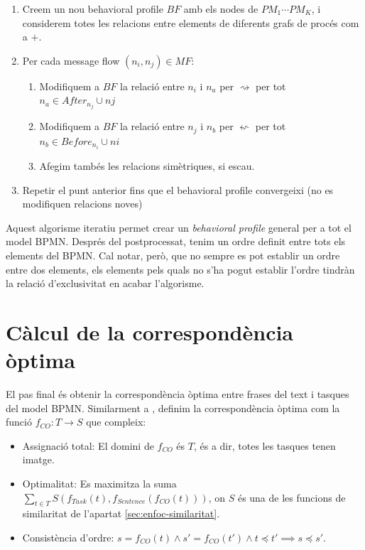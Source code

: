 \begin{enumerate}
    \item Creem un nou behavioral profile $BF$ amb els nodes de $PM_1 \cdots PM_K$, i considerem totes les relacions entre elements de diferents grafs de procés com a $+$.
    \item Per cada message flow $(n_i, n_j) \in MF$:
        \begin{enumerate}
            \item Modifiquem a $BF$ la relació entre $n_i$ i $n_a$ per $\rightsquigarrow$ per tot $n_a \in After_{n_j} \cup {nj}$
            \item Modifiquem a $BF$ la relació entre $n_j$ i $n_b$ per $\leftsquigarrow$ per tot $n_b \in Before_{n_i} \cup {ni}$
            \item Afegim tambés les relacions simètriques, si escau.
        \end{enumerate}
    \item Repetir el punt anterior fins que el behavioral profile convergeixi (no es modifiquen relacions noves)
\end{enumerate}

Aquest algorisme iteratiu permet crear un \textit{behavioral profile} general per a tot el model BPMN. Després del postprocessat, tenim un ordre definit entre tots els elements del BPMN. Cal notar, però, que no sempre es pot establir un ordre entre dos elements, els elements pels quals no s'ha pogut establir l'ordre tindràn la relació d'exclusivitat en acabar l'algorisme.

\section{Càlcul de la correspondència òptima}
\label{sec:enfoc-matching}

El pas final és obtenir la correspondència òptima entre frases del text i tasques del model BPMN. Similarment a \cite{el_paper}, definim la correspondència òptima com la funció $f_{CO} : T \rightarrow S$ que compleix:

\begin{itemize}
    \item Assignació total: El domini de $f_{CO}$ és $T$, és a dir, totes les tasques tenen imatge.
    \item Optimalitat: Es maximitza la suma $\sum_{t \in T}{S(f_{Task}(t), f_{Sentence}(f_{CO}(t)))}$, on $S$ és una de les funcions de similaritat de l'apartat \ref{sec:enfoc-similaritat}.
    \item Consistència d'ordre: $s = f_{CO}(t) \land s' = f_{CO}(t') \land t \preceq t' \implies s \preceq s'$.
\end{itemize}

